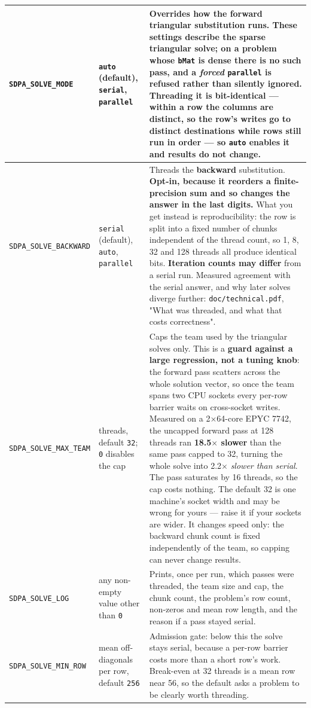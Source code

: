 \documentclass[11pt]{article}
\newcommand{\code}[1]{\texttt{#1}}
\begin{document}
\begin{longtable}{@{}p{}p{}p{}@{}}
\midrule
\code{SDPA\_SOLVE\_MODE} & \code{auto} (default), \code{serial}, \code{parallel} & Overrides how the \textbf{forward} triangular substitution runs. These settings describe the \textbf{sparse} triangular solve; on a problem whose \code{bMat} is dense there is no such pass, and a \emph{forced} \code{parallel} is refused rather than silently ignored. Threading it is \textbf{bit-identical} --- within a row the columns are distinct, so the row's writes go to distinct destinations while rows still run in order --- so \code{auto} enables it and results do not change. \\
\midrule
\code{SDPA\_SOLVE\_BACKWARD} & \code{serial} (default), \code{auto}, \code{parallel} & Threads the \textbf{backward} substitution. \textbf{Opt-in, because it reorders a finite-precision sum and so changes the answer in the last digits.} What you get instead is reproducibility: the row is split into a fixed number of chunks independent of the thread count, so 1, 8, 32 and 128 threads all produce identical bits. \textbf{Iteration counts may differ} from a serial run. Measured agreement with the serial answer, and why later solves diverge further: \code{doc/technical.pdf}, "What was threaded, and what that costs correctness". \\
\midrule
\code{SDPA\_SOLVE\_MAX\_TEAM} & threads, default \code{32}; \code{0} disables the cap & Caps the team used by the triangular solves only. This is a \textbf{guard against a large regression, not a tuning knob}: the forward pass scatters across the whole solution vector, so once the team spans two CPU sockets every per-row barrier waits on cross-socket writes. Measured on a 2$\times$64-core EPYC 7742, the uncapped forward pass at 128 threads ran \textbf{18.5$\times$ slower} than the same pass capped to 32, turning the whole solve into 2.2$\times$ \emph{slower than serial}. The pass saturates by 16 threads, so the cap costs nothing. The default 32 is one machine's socket width and may be wrong for yours --- raise it if your sockets are wider. It changes speed only: the backward chunk count is fixed independently of the team, so capping can never change results. \\
\midrule
\code{SDPA\_SOLVE\_LOG} & any non-empty value other than \code{0} & Prints, once per run, which passes were threaded, the team size and cap, the chunk count, the problem's row count, non-zeros and mean row length, and the reason if a pass stayed serial. \\
\midrule
\code{SDPA\_SOLVE\_MIN\_ROW} & mean off-diagonals per row, default \code{256} & Admission gate: below this the solve stays serial, because a per-row barrier costs more than a short row's work. Break-even at 32 threads is a mean row near 56, so the default asks a problem to be clearly worth threading. \\

\end{longtable}
\end{document}
